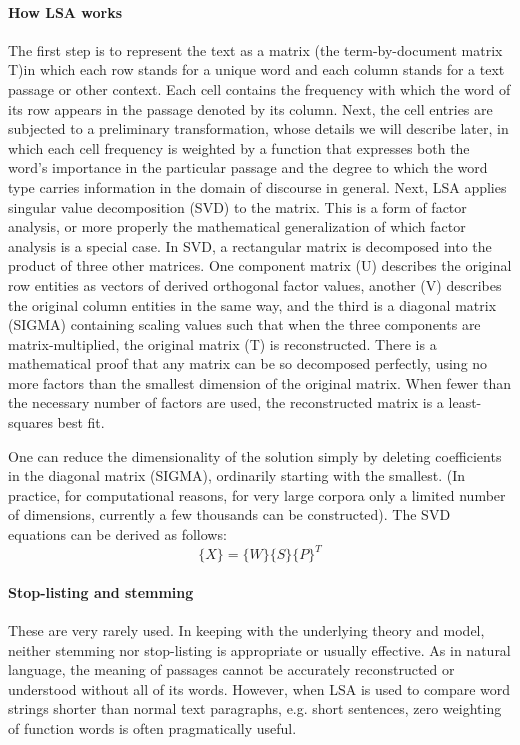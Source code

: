 \paragraph{How LSA works}
The first step is to represent the text as a matrix (the term-by-document matrix T)in which each row stands for a unique word and each column stands for a text passage or other context. Each cell contains the frequency with which the word of its row appears in the passage denoted by its column. Next, the cell entries are subjected to a preliminary transformation, whose details we will describe later, in which each cell frequency is weighted by a function that expresses both the word's importance in the particular passage and the degree to which the word type carries information in the domain of discourse in general.
Next, LSA applies singular value decomposition (SVD) to the matrix. This is a form of factor analysis, or more properly the mathematical generalization of which factor analysis is a special case. In SVD, a rectangular matrix is decomposed into the product of three other matrices. One component matrix (U) describes the original row entities as vectors of derived orthogonal factor values, another (V) describes the original column entities in the same way, and the third is a diagonal matrix (SIGMA) containing scaling values such that when the three components are matrix-multiplied, the original matrix (T) is reconstructed. 
There is a mathematical proof that any matrix can be so decomposed perfectly, using no more factors than the smallest dimension of the original matrix. When fewer than the necessary number of factors are used, the reconstructed matrix is a least-squares best fit. 

One can reduce the dimensionality of the solution simply by deleting coefficients in the diagonal matrix (SIGMA), ordinarily starting with the smallest. (In practice, for computational reasons, for very large corpora only a limited number of dimensions, currently a few thousands can be constructed). The SVD equations can be derived as follows\citep{lsa}:\\
\begin{equation}
\{X\} = \{W\}\{S\}\{P\}^T
\end{equation}

\paragraph{Stop-listing and stemming}
These are very rarely used. In keeping with the underlying theory and model, neither stemming nor stop-listing is appropriate or usually effective. As in natural language, the meaning of passages cannot be accurately reconstructed or understood without all of its words. However, when LSA is used to compare word strings shorter than normal text paragraphs, e.g. short sentences, zero weighting of function words is often pragmatically useful.
